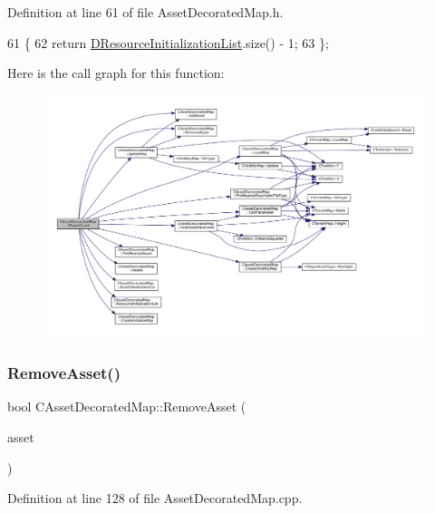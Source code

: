 Definition at line 61 of file Asset\+Decorated\+Map.\+h.


\begin{DoxyCode}
61                                \{
62              \textcolor{keywordflow}{return} \hyperlink{classCAssetDecoratedMap_ab4c78aeb90280ea98a3aa542cdb7f8cc}{DResourceInitializationList}.size() - 1;
63         \};
\end{DoxyCode}
Here is the call graph for this function\+:
\nopagebreak
\begin{figure}[H]
\begin{center}
\leavevmode
\includegraphics[width=350pt]{classCAssetDecoratedMap_a1ead2938a9585fa82b5b5ef72efe6eba_cgraph}
\end{center}
\end{figure}
\hypertarget{classCAssetDecoratedMap_a77f46be1ceb30bb83fc3f35c0d58a9a7}{}\label{classCAssetDecoratedMap_a77f46be1ceb30bb83fc3f35c0d58a9a7} 
\subsubsection{\texorpdfstring{Remove\+Asset()}{RemoveAsset()}}
{\footnotesize\ttfamily bool C\+Asset\+Decorated\+Map\+::\+Remove\+Asset (\begin{DoxyParamCaption}\item[{std\+::shared\+\_\+ptr$<$ \hyperlink{classCPlayerAsset}{C\+Player\+Asset} $>$}]{asset }\end{DoxyParamCaption})}



Definition at line 128 of file Asset\+Decorated\+Map.\+cpp.


